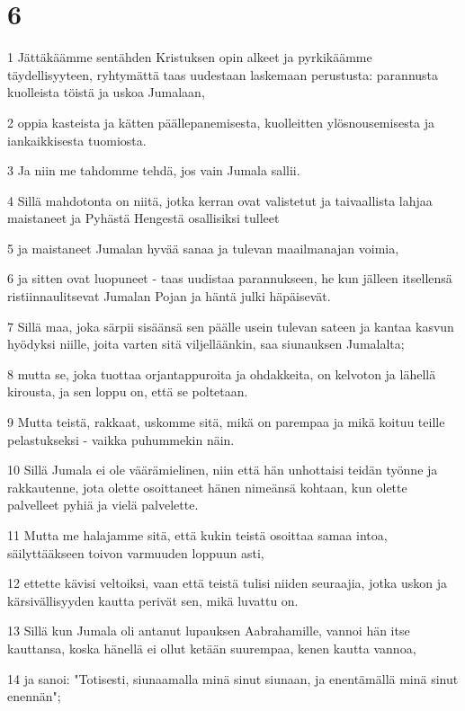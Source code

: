 \chapter{6}

\par 1 Jättäkäämme sentähden Kristuksen opin alkeet ja pyrkikäämme täydellisyyteen, ryhtymättä taas uudestaan laskemaan perustusta: parannusta kuolleista töistä ja uskoa Jumalaan,
\par 2 oppia kasteista ja kätten päällepanemisesta, kuolleitten ylösnousemisesta ja iankaikkisesta tuomiosta.
\par 3 Ja niin me tahdomme tehdä, jos vain Jumala sallii.
\par 4 Sillä mahdotonta on niitä, jotka kerran ovat valistetut ja taivaallista lahjaa maistaneet ja Pyhästä Hengestä osallisiksi tulleet
\par 5 ja maistaneet Jumalan hyvää sanaa ja tulevan maailmanajan voimia,
\par 6 ja sitten ovat luopuneet - taas uudistaa parannukseen, he kun jälleen itsellensä ristiinnaulitsevat Jumalan Pojan ja häntä julki häpäisevät.
\par 7 Sillä maa, joka särpii sisäänsä sen päälle usein tulevan sateen ja kantaa kasvun hyödyksi niille, joita varten sitä viljelläänkin, saa siunauksen Jumalalta;
\par 8 mutta se, joka tuottaa orjantappuroita ja ohdakkeita, on kelvoton ja lähellä kirousta, ja sen loppu on, että se poltetaan.
\par 9 Mutta teistä, rakkaat, uskomme sitä, mikä on parempaa ja mikä koituu teille pelastukseksi - vaikka puhummekin näin.
\par 10 Sillä Jumala ei ole väärämielinen, niin että hän unhottaisi teidän työnne ja rakkautenne, jota olette osoittaneet hänen nimeänsä kohtaan, kun olette palvelleet pyhiä ja vielä palvelette.
\par 11 Mutta me halajamme sitä, että kukin teistä osoittaa samaa intoa, säilyttääkseen toivon varmuuden loppuun asti,
\par 12 ettette kävisi veltoiksi, vaan että teistä tulisi niiden seuraajia, jotka uskon ja kärsivällisyyden kautta perivät sen, mikä luvattu on.
\par 13 Sillä kun Jumala oli antanut lupauksen Aabrahamille, vannoi hän itse kauttansa, koska hänellä ei ollut ketään suurempaa, kenen kautta vannoa,
\par 14 ja sanoi: "Totisesti, siunaamalla minä sinut siunaan, ja enentämällä minä sinut enennän";
